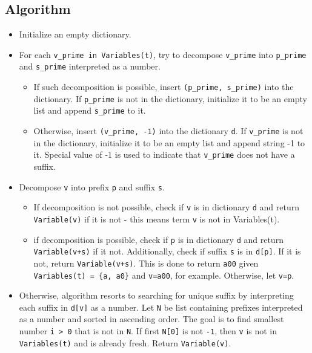 \subsection{Algorithm}
\begin{itemize}
\item
Initialize an empty dictionary.

\item
For each \texttt{v\_prime in Variables(t)}, try to decompose \texttt{v\_prime} into \texttt{p\_prime} and \texttt{s\_prime} interpreted as a number. 

	\begin{itemize}
	\item
	If such decomposition is possible, insert \texttt{(p\_prime, s\_prime)} into the dictionary. If \texttt{p\_prime} is not in the dictionary, initialize it to be an empty list and append \texttt{s\_prime} to it.

	\item
		Otherwise, insert \texttt{(v\_prime, -1)} into the dictionary \texttt{d}. If \texttt{v\_prime} is not in the dictionary, initialize it to be an empty list and append string -1 to it. Special value of -1 is used to indicate that \texttt{v\_prime} does not have a suffix.
	\end{itemize}

\item
Decompose \texttt{v} into prefix \texttt{p} and suffix \texttt{s}.

	\begin{itemize}
	\item
	If decomposition is not possible, check if \texttt{v} is in dictionary \texttt{d} and return \texttt{Variable(v)} if it is not - this means term \texttt{v} is not in Variables(t).
	\item
	if decomposition is possible, check if \texttt{p} is in dictionary \texttt{d} and return \texttt{Variable(v+s)} if it not. Additionally, check if suffix \texttt{s} is in \texttt{d[p]}. If it is not, return \texttt{Variable(v+s)}. This is done to return \texttt{a00} given \texttt{Variables(t) = \{a, a0\}} and \texttt{v=a00}, for example. Otherwise, let \texttt{v=p}.
	\end{itemize}

\item
Otherwise, algorithm resorts to searching for unique suffix by interpreting each suffix in \texttt{d[v]} as a number. Let \texttt{N} be list containing prefixes interpreted as a number and sorted in ascending order.  The goal is to find smallest number \texttt{i > 0} that is not in \texttt{N}. If first \texttt{N[0]} is not \texttt{-1}, then \texttt{v} is not in \texttt{Variables(t)} and is already fresh. Return \texttt{Variable(v)}.


\end{itemize}
